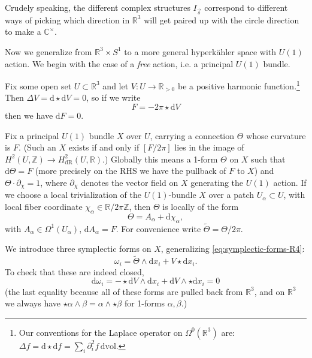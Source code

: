 \documentclass[12pt,letterpaper,reqno]{article}
\numberwithin{equation}{section}
\newcommand{\R}{\ensuremath{\mathbb R}}
\newcommand{\C}{\ensuremath{\mathbb C}}
\newcommand{\Z}{\ensuremath{\mathbb Z}}
\newcommand{\hk}{hyperk\"ahler\xspace}
\newcommand{\de}{\mathrm{d}}
\newcommand{\vol}{\mathrm{vol}}
\newcommand{\dR}{\mathrm{dR}}
\newcommand{\ti}[1]{\textit{#1}}
\begin{document}
Crudely speaking, the different complex structures
$I_{\vec s}$ correspond to different ways of picking which
direction in $\R^3$ will get
paired up with the circle direction to make a $\C^\times$.

\begin{example} \label{exa:incomplete-gibbons-hawking}
Now we generalize from $\R^3 \times S^1$ to a more general
\hk space with $U(1)$ action. We begin with the case of
a \ti{free} action, i.e. a principal
$U(1)$ bundle.

Fix some open set $U \subset \R^3$ and
let $V: U \to \R_{>0}$ be a positive harmonic function.\footnote{Our
conventions for the Laplace operator on $\Omega^0(\R^3)$ are:
$\Delta f = \de \star \de f = \sum_i \partial_i^2 f \, \de \vol$.}
Then $\Delta V = \de \star \de V = 0$, so if we write
\begin{equation}
  F = -2 \pi \star \de V
\end{equation}
then we have $\de F = 0$.

Fix a principal $U(1)$ bundle $X$ over $U$, carrying a connection
$\Theta$ whose curvature is $F$.
(Such an $X$ exists if and only if $[F/2\pi]$ lies in
the image of $H^2(U,\Z) \to H^2_{\dR}(U,\R)$.)
Globally this means a 1-form $\Theta$ on $X$
such that $\de \Theta = F$ (more precisely on the RHS we have
the pullback of $F$ to $X$) and $\Theta \cdot \partial_\chi = 1$,
where $\partial_\chi$ denotes the vector field on $X$
generating the $U(1)$ action. If we choose a local
trivialization of the $U(1)$-bundle $X$ over a patch
$U_\alpha \subset U$, with local
fiber coordinate $\chi_{\alpha} \in \R / 2 \pi \Z$, then $\Theta$
is locally of the form
\begin{equation}
 \Theta = A_\alpha + \de \chi_{\alpha},
\end{equation}
with $A_\alpha \in \Omega^1(U_\alpha)$, $\de A_\alpha = F$.
\newcommand{\tTheta}{\tilde\Theta}
For convenience write $\tTheta = \Theta / 2\pi$.

We introduce three symplectic forms on $X$,
generalizing \eqref{eq:symplectic-forms-R4}:
\begin{equation}
  \omega_i = \tTheta \wedge \de x_i + V \star \de x_i.
\end{equation}
To check that these are indeed closed,
\begin{equation}
  \de \omega_i = - \star \de V \wedge \de x_i + \de V \wedge \star \de x_i = 0
\end{equation}
(the last equality because all of these forms are pulled back
from $\R^3$, and on $\R^3$ we always have $\star \alpha \wedge \beta = \alpha \wedge \star \beta$ for 1-forms $\alpha, \beta$.)


\end{example}
\end{document}
